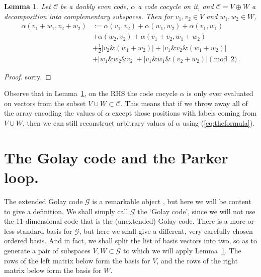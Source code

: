 \documentclass{article}
\theoremstyle{plain}
\newtheorem{lemma}{Lemma}
\theoremstyle{definition}
\def \cC {\mathcal{C}}
\def \cG {\mathcal{G}}
\def\And{\mathbin{\&}}
\def\Plus{+}
\begin{document}
\begin{lemma}\label{lemma:formula lemma}
Let $\cC$ be a doubly even code, $\alpha$ a code cocycle on it, and $\cC = V\oplus W$ a decomposition into complementary subspaces.
Then for $v_1,v_2\in V$ and $w_1,w_2\in W$,
\begin{align}\label{eq:theformula}
	\alpha(v_1\Plus w_1,v_2\Plus w_2)	
		& := \alpha(v_1,v_2)  + \alpha(w_1,w_2) + \alpha(v_1,w_1)  \\
		&+ \alpha(w_2,v_2) + \alpha(v_1\Plus v_2,w_1\Plus w_2) \nonumber \\
							& + \tfrac12|v_2\And(w_1\Plus w_2)| + |v_1\And v_2 \And (w_1\Plus w_2)| \nonumber \\
							&+|w_1\And w_2 \And v_2| + \left|v_1\And w_1 \And (v_2 \Plus  w_2)\right| \pmod 2\,. \nonumber
\end{align}
\end{lemma}

\begin{proof}
sorry.
\end{proof}

Observe that in Lemma~\ref{lemma:formula lemma}, on the RHS the code cocycle $\alpha$ is only ever evaluated on vectors from the subset $V \cup W \subset \cC$.
This means that if we throw away all of the array encoding the values of $\alpha$ except those positions with labels coming from $V\cup W$, then we can still reconstruct arbitrary values of $\alpha$ using (\ref{eq:theformula}).

\section{The Golay code and the Parker loop.}

The extended Golay code $\cG$ is a remarkable object \cite{Thompson}, but here we will be content to give a definition. 
We shall simply call $\cG$ the `Golay code', since we will not use the 11-dimensional code that is the (unextended) Golay code.
There is a more-or-less standard basis for $\cG$, but here we shall give a different, very carefully chosen ordered basis.
And in fact, we shall split the list of basis vectors into two, so as to generate a pair of subspaces $V,W\subset \cG$ to which we will apply Lemma~\ref{lemma:formula lemma}.
The rows of the left matrix below form the basis for $V$, and the rows of the right matrix below form the basis for $W$.
\end{document}
